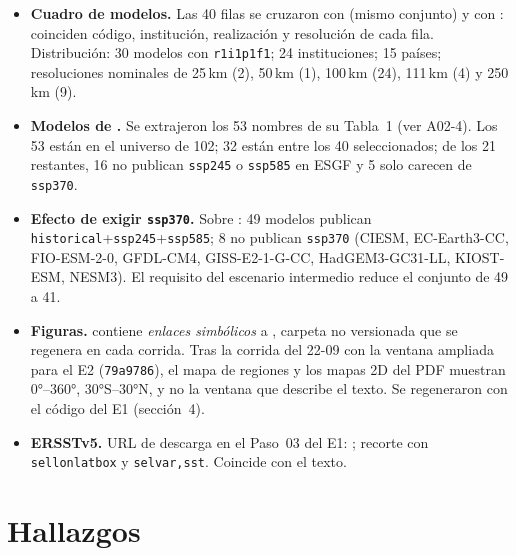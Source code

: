 \begin{itemize}[leftmargin=1.2em]
\item \textbf{Cuadro de modelos.} Las 40 filas se cruzaron con  (mismo conjunto) y con : coinciden código, institución, realización y resolución de cada fila. Distribución: 30 modelos con \texttt{r1i1p1f1}; 24 instituciones; 15 países; resoluciones nominales de 25\,km (2), 50\,km (1), 100\,km (24), 111\,km (4) y 250\,km (9).
\item \textbf{Modelos de \citet{bruno2023}.} Se extrajeron los 53 nombres de su Tabla~1 (ver A02-4). Los 53 están en el universo de 102; 32 están entre los 40 seleccionados; de los 21 restantes, 16 no publican \texttt{ssp245} o \texttt{ssp585} en ESGF y 5 solo carecen de \texttt{ssp370}.
\item \textbf{Efecto de exigir \texttt{ssp370}.} Sobre : 49 modelos publican \texttt{historical}+\texttt{ssp245}+\texttt{ssp585}; 8 no publican \texttt{ssp370} (CIESM, EC-Earth3-CC, FIO-ESM-2-0, GFDL-CM4, GISS-E2-1-G-CC, HadGEM3-GC31-LL, KIOST-ESM, NESM3). El requisito del escenario intermedio reduce el conjunto de 49 a 41.
\item \textbf{Figuras.}  contiene \emph{enlaces simbólicos} a , carpeta no versionada que se regenera en cada corrida. Tras la corrida del 22-09 con la ventana ampliada para el E2 (\texttt{79a9786}), el mapa de regiones y los mapas 2D del PDF muestran 0°--360°, 30°S--30°N, y no la ventana que describe el texto. Se regeneraron con el código del E1 (sección~4).
\item \textbf{ERSSTv5.} URL de descarga en el Paso~03 del E1: ; recorte con \texttt{sellonlatbox} y \texttt{selvar,sst}. Coincide con el texto.
\end{itemize}

\section{Hallazgos}

